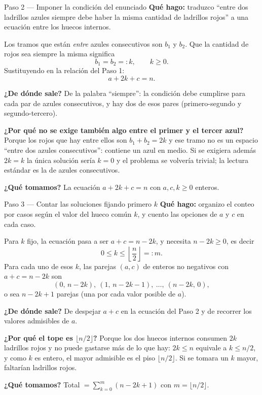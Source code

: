 \documentclass[11pt]{article}
\begin{document}
\begin{paso}{Paso 2 --- Imponer la condición del enunciado}
\textbf{Qué hago:} traduzco ``entre dos ladrillos azules siempre debe haber la misma cantidad de ladrillos rojos'' a una ecuación entre los huecos internos.

Los tramos que están \emph{entre} azules consecutivos son $b_1$ y $b_2$. Que la cantidad de rojos sea siempre la misma significa
\[
b_1 = b_2 =: k,\qquad k\ge 0 .
\]
Sustituyendo en la relación del Paso 1:
\[
a + 2k + c = n .
\]

\textbf{¿De dónde sale?} De la palabra ``siempre'': la condición debe cumplirse para cada par de azules consecutivos, y hay dos de esos pares (primero-segundo y segundo-tercero).

\textbf{¿Por qué no se exige también algo entre el primer y el tercer azul?} Porque los rojos que hay entre ellos son $b_1+b_2 = 2k$ y ese tramo no es un espacio ``entre dos azules consecutivos'': contiene un azul en medio. Si se exigiera además $2k = k$ la única solución sería $k=0$ y el problema se volvería trivial; la lectura estándar es la de azules consecutivos.

\textbf{¿Qué tomamos?} La ecuación $a+2k+c=n$ con $a,c,k\ge 0$ enteros.
\end{paso}

\begin{paso}{Paso 3 --- Contar las soluciones fijando primero $k$}
\textbf{Qué hago:} organizo el conteo por casos según el valor del hueco común $k$, y cuento las opciones de $a$ y $c$ en cada caso.

Para $k$ fijo, la ecuación pasa a ser $a+c = n-2k$, y necesita $n-2k\ge 0$, es decir
\[
0\le k\le \left\lfloor \frac{n}{2} \right\rfloor =: m .
\]
Para cada uno de esos $k$, las parejas $(a,c)$ de enteros no negativos con $a+c=n-2k$ son
\[
(0,\,n-2k),\ (1,\,n-2k-1),\ \dots,\ (n-2k,\,0),
\]
o sea $n-2k+1$ parejas (una por cada valor posible de $a$).

\textbf{¿De dónde sale?} De despejar $a+c$ en la ecuación del Paso 2 y de recorrer los valores admisibles de $a$.

\textbf{¿Por qué el tope es $\lfloor n/2\rfloor$?} Porque los dos huecos internos consumen $2k$ ladrillos rojos y no puede gastarse más de lo que hay: $2k\le n$ equivale a $k\le n/2$, y como $k$ es entero, el mayor admisible es el piso $\lfloor n/2\rfloor$. Si se tomara un $k$ mayor, faltarían ladrillos rojos.

\textbf{¿Qué tomamos?} Total $=\displaystyle\sum_{k=0}^{m}(n-2k+1)$ con $m=\lfloor n/2\rfloor$.
\end{paso}
\end{document}

